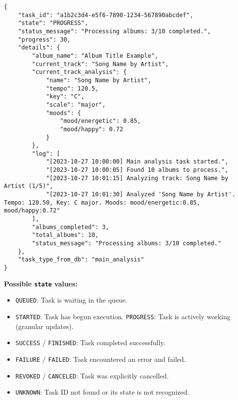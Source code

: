 \documentclass{article}
\begin{document}
\lstset{language=json, caption=Example Response: Get Task Status}
\begin{lstlisting}
{
    "task_id": "a1b2c3d4-e5f6-7890-1234-567890abcdef",
    "state": "PROGRESS",
    "status_message": "Processing albums: 3/10 completed.",
    "progress": 30,
    "details": {
        "album_name": "Album Title Example",
        "current_track": "Song Name by Artist",
        "current_track_analysis": {
            "name": "Song Name by Artist",
            "tempo": 120.5,
            "key": "C",
            "scale": "major",
            "moods": {
                "mood/energetic": 0.85,
                "mood/happy": 0.72
            }
        },
        "log": [
            "[2023-10-27 10:00:00] Main analysis task started.",
            "[2023-10-27 10:00:05] Found 10 albums to process.",
            "[2023-10-27 10:01:15] Analyzing track: Song Name by Artist (1/5)",
            "[2023-10-27 10:01:30] Analyzed 'Song Name by Artist'. Tempo: 120.50, Key: C major. Moods: mood/energetic:0.85, mood/happy:0.72"
        ],
        "albums_completed": 3,
        "total_albums": 10,
        "status_message": "Processing albums: 3/10 completed."
    },
    "task_type_from_db": "main_analysis"
}
\end{lstlisting}
\textbf{Possible \texttt{state} values:}
\begin{itemize}[noitemsep]
    \item \texttt{QUEUED}: Task is waiting in the queue.
    \item \texttt{STARTED}: Task has begun execution.
    \texttt{PROGRESS}: Task is actively working (granular updates).
    \item \texttt{SUCCESS} / \texttt{FINISHED}: Task completed successfully.
    \item \texttt{FAILURE} / \texttt{FAILED}: Task encountered an error and failed.
    \item \texttt{REVOKED} / \texttt{CANCELED}: Task was explicitly cancelled.
    \item \texttt{UNKNOWN}: Task ID not found or its state is not recognized.
\end{itemize}
\end{document}

